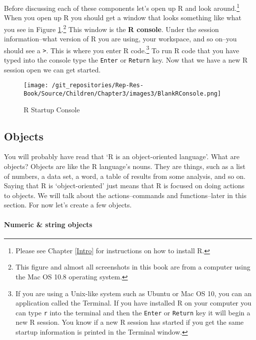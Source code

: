 \documentclass[ChapterTOCs,krantz1]{krantz}\usepackage{graphicx, color}
\begin{document}
Before discussing each of these components let's open up R and look around.\footnote{Please see Chapter \ref{Intro} for instructions on how to install R.} When you open up R you should get a window that looks something like what you see in Figure \ref{RBlankMain}.\footnote{This figure and almost all screenshots in this book are from a computer using the Mac OS 10.8 operating system.} This window is the {\bf{R console}}. Under the session information--what version of R you are using, your workspace, and so on--you should see a {\tt{\textgreater}}. This is where you enter R code.\footnote{If you are using a Unix-like system such as Ubuntu or Mac OS 10, you can an application called the Terminal. If you have installed R on your computer you can type {\tt{r}} into the terminal and then the {\tt{Enter}} or {\tt{Return}} key it will begin a new R session. You know if a new R session has started if you get the same startup information is printed in the Terminal window.} To run R code that you have typed into the console type the {\tt{Enter}} or {\tt{Return}} key. Now that we have a new R session open we can get started. 

\begin{figure}[th!]
    \caption{R Startup Console}
    \label{RBlankMain}
    \begin{center}
    \texttt{[image: /git\_repositories/Rep-Res-Book/Source/Children/Chapter3/images3/BlankRConsole.png]}
    \end{center}
\end{figure}

\subsection{Objects}

You will probably have read that `R is an object-oriented language'.  What are objects? Objects are like the R language's nouns. They are things, such as a list of numbers, a data set, a word, a table of results from some analysis, and so on. Saying that R is `object-oriented' just means that R is focused on doing actions to objects. We will talk about the actions--commands and functions--later in this section. For now let's create a few objects.

\paragraph{Numeric \& string objects}
\end{document}
